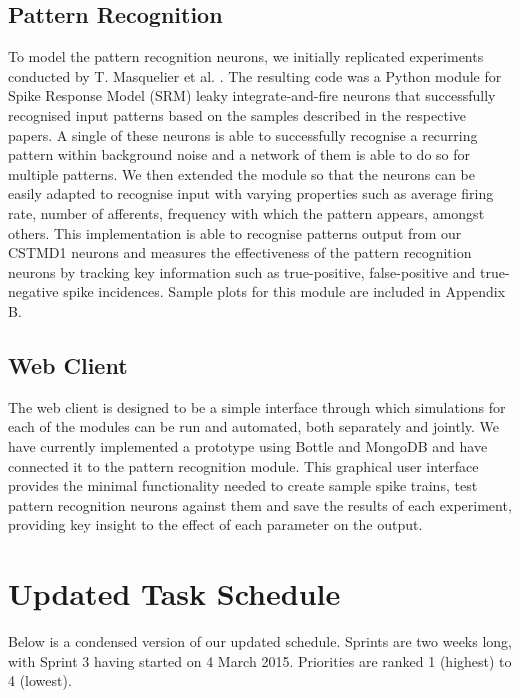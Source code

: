 \documentclass[a4paper,11pt]{article}
\begin{document}
\subsection{Pattern Recognition}
To model the pattern recognition neurons, we initially replicated experiments conducted by T. Masquelier et al. \cite{stdp2} \cite{stdp1} . The resulting code was a Python module for Spike Response Model (SRM) leaky integrate-and-fire neurons that successfully recognised input patterns based on the samples described in the respective papers. A single of these neurons is able to successfully recognise a recurring pattern within background noise and a network of them is able to do so for multiple patterns. We then extended the module so that the neurons can be easily adapted to recognise input with varying properties such as average firing rate, number of afferents, frequency with which the pattern appears, amongst others. This implementation is able to recognise patterns output from our CSTMD1 neurons and measures the effectiveness of the pattern recognition neurons by tracking key information such as true-positive, false-positive and true-negative spike incidences. Sample plots for this module are included in Appendix B.

\subsection{Web Client}
The web client is designed to be a simple interface through which simulations for each of the modules can be run and automated, both separately and jointly. We have currently implemented a prototype using Bottle and MongoDB and have connected it to the pattern recognition module. This graphical user interface provides the minimal functionality needed to create sample spike trains, test pattern recognition neurons against them and save the results of each experiment, providing key insight to the effect of each parameter on the output.


\section{Updated Task Schedule}	

Below is a condensed version of our updated schedule. Sprints are two weeks long, with Sprint 3 having started on 4 March 2015. Priorities are ranked 1 (highest) to 4 (lowest). 
\end{document}
